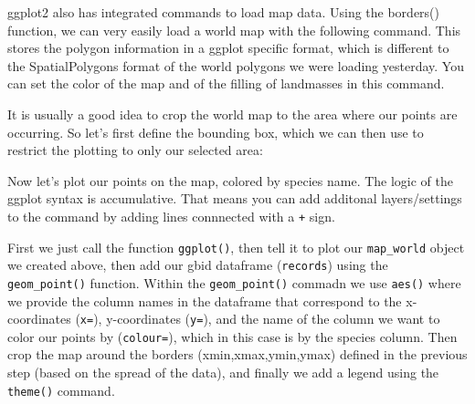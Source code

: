 \documentclass[]{article}
\newenvironment{Shaded}{\begin{snugshade}}{\end{snugshade}}
\newcommand{\DataTypeTok}[1]{\textcolor[rgb]{0.13,0.29,0.53}{#1}}
\newcommand{\KeywordTok}[1]{\textcolor[rgb]{0.13,0.29,0.53}{\textbf{#1}}}
\newcommand{\NormalTok}[1]{#1}
\newcommand{\OperatorTok}[1]{\textcolor[rgb]{0.81,0.36,0.00}{\textbf{#1}}}
\newcommand{\StringTok}[1]{\textcolor[rgb]{0.31,0.60,0.02}{#1}}
\begin{document}
ggplot2 also has integrated commands to load map data. Using the
borders() function, we can very easily load a world map with the
following command. This stores the polygon information in a ggplot
specific format, which is different to the SpatialPolygons format of the
world polygons we were loading yesterday. You can set the color of the
map and of the filling of landmasses in this command.

\begin{Shaded}
\end{Shaded}

It is usually a good idea to crop the world map to the area where our
points are occurring. So let's first define the bounding box, which we
can then use to restrict the plotting to only our selected area:

\begin{Shaded}
\end{Shaded}

Now let's plot our points on the map, colored by species name. The logic
of the ggplot syntax is accumulative. That means you can add additonal
layers/settings to the command by adding lines connnected with a
\texttt{+} sign.

First we just call the function \texttt{ggplot()}, then tell it to plot
our \texttt{map\_world} object we created above, then add our gbid
dataframe (\texttt{records}) using the \texttt{geom\_point()} function.
Within the \texttt{geom\_point()} commadn we use \texttt{aes()} where we
provide the column names in the dataframe that correspond to the
x-coordinates (\texttt{x=}), y-coordinates (\texttt{y=}), and the name
of the column we want to color our points by (\texttt{colour=}), which
in this case is by the species column. Then crop the map around the
borders (xmin,xmax,ymin,ymax) defined in the previous step (based on the
spread of the data), and finally we add a legend using the
\texttt{theme()} command.
\end{document}
